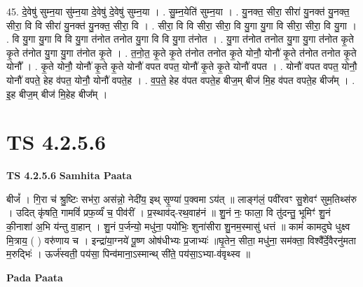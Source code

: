 \documentclass[17pt]{extarticle}
\begin{document}
45. दे॒वेषु॑ सुम्न॒या सु॑म्न॒या दे॒वेषु॑ दे॒वेषु॑ सुम्न॒या । . सु॒म्न॒येति॑ सुम्न॒या । . यु॒नक्त॒ सीरा॒ सीरा॑ यु॒नक्त॑ यु॒नक्त॒ सीरा॒ वि वि सीरा॑ यु॒नक्त॑ यु॒नक्त॒ सीरा॒ वि । . सीरा॒ वि वि सीरा॒ सीरा॒ वि यु॒गा यु॒गा वि सीरा॒ सीरा॒ वि यु॒गा । . वि यु॒गा यु॒गा वि वि यु॒गा त॑नोत तनोत यु॒गा वि वि यु॒गा त॑नोत । . यु॒गा त॑नोत तनोत यु॒गा यु॒गा त॑नोत कृ॒ते कृ॒ते त॑नोत यु॒गा यु॒गा त॑नोत कृ॒ते । . त॒नो॒त॒ कृ॒ते कृ॒ते त॑नोत तनोत कृ॒ते योनौ॒ योनौ॑ कृ॒ते त॑नोत तनोत कृ॒ते योनौ᳚ । . कृ॒ते योनौ॒ योनौ॑ कृ॒ते कृ॒ते योनौ॑ वपत वपत॒ योनौ॑ कृ॒ते कृ॒ते योनौ॑ वपत । . योनौ॑ वपत वपत॒ योनौ॒ योनौ॑ वपते॒ हेह व॑पत॒ योनौ॒ योनौ॑ वपते॒ह । . व॒प॒ते॒ हेह व॑पत वपते॒ह बीज॒म् बीज॑ मि॒ह व॑पत वपते॒ह बीज᳚म् । . इ॒ह बीज॒म् बीज॑ मि॒हेह बीज᳚म् । \newline
\pagebreak
{}

\section{ TS 4.2.5.6 }

\textbf{TS 4.2.5.6 } \newline
\textbf{Samhita Paata} \newline

बीजं᳚ । गि॒रा च॑ श्रु॒ष्टिः सभ॑रा॒ अस॑न्नो॒ नेदी॑य॒ इथ् सृ॒ण्या॑ प॒क्वमा ऽय॑त् ॥ लाङ्ग॑लं॒ पवी॑रवꣳ सु॒शेवꣳ॑ सुम॒तिथ्स॑रु । उदित् कृ॑षति॒ गामविं॑ प्रफ॒र्व्यं॑ च॒ पीव॑रीं । प्र॒स्थाव॑द्-रथ॒वाह॑नं ॥ शु॒नं नः॒ फाला॒ वि तु॑दन्तु॒ भूमिꣳ॑ शु॒नं की॒नाशा॑ अ॒भि य॑न्तु वा॒हान् । शु॒नं प॒र्जन्यो॒ मधु॑ना॒ पयो॑भिः॒ शुना॑सीरा शु॒नम॒स्मासु॑ धत्तं ॥ कामं॑ कामदुघे धुक्ष्व मि॒त्राय॒ ( ) वरु॑णाय च । इन्द्रा॑या॒ग्नये॑ पू॒ष्ण ओष॑धीभ्यः प्र॒जाभ्यः॑ ॥घृ॒तेन॒ सीता॒ मधु॑ना॒ सम॑क्ता॒ विश्वै᳚र्दे॒वैरनु॑मता म॒रुद्भिः॑ । ऊर्ज॑स्वती॒ पय॑सा॒ पिन्व॑माना॒ऽस्मान्थ् सी॑ते॒ पय॑सा॒ऽभ्या-व॑वृथ्स्व ॥ \newline

\textbf{Pada Paata} \newline
\end{document}
